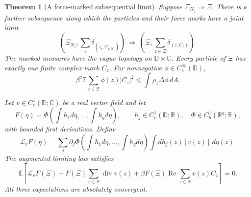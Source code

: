 \documentclass[11pt,a4paper]{article}
\numberwithin{equation}{section}
\newtheorem{theorem}{Theorem}[section]
\theoremstyle{definition}
\theoremstyle{remark}
\newcommand{\D}{\mathbb D}
\newcommand{\E}{\mathbb E}
\newcommand{\C}{\mathbb C}
\newcommand{\R}{\mathbb R}
\begin{document}
\begin{theorem}[A force-marked subsequential limit]
\label{thm:force-marked-limit}
Suppose $\Xi_{N_j}\Rightarrow\Xi$. There is a further subsequence along
which the particles and their force marks have a joint limit
\[
 \left(\Xi_{N_j},\sum_i\delta_{(z_i,C_{i,N_j})}\right)
 \ \Longrightarrow\
 \left(\Xi,\sum_{z\in\Xi}\delta_{(z,C_z)}\right).
\]
The marked measures have the vague topology on $\D\times\C$.
Every particle of $\Xi$ has exactly one finite complex mark $C_z$.
For nonnegative $\phi\in C_c^\infty(\D)$,
\begin{equation}\label{eq:limiting-force-energy}
 \beta^2\E\sum_{z\in\Xi}\phi(z)|C_z|^2
 \le\int\rho_1\Delta\phi\,dA.
\end{equation}

Let $v\in C_c^1(\D;\C)$ be a real vector field and let
\[
 F(\eta)=\Phi\left(\int h_1d\eta,\ldots,\int h_qd\eta\right),
 \qquad h_j\in C_c^1(\D;\R),\quad\Phi\in C_b^1(\R^q;\R),
\]
with bounded first derivatives. Define
\[
 \mathcal L_vF(\eta)
 =\sum_j\partial_j\Phi\left(\int h_1d\eta,\ldots,\int h_qd\eta\right)
                   \int dh_j(z)[v(z)]\,d\eta(z).
\]
The augmented limiting law satisfies
\begin{equation}\label{eq:augmented-limit-ward}
 \E\left[\mathcal L_vF(\Xi)
       +F(\Xi)\sum_{z\in\Xi}\operatorname{div}v(z)
       +\beta F(\Xi)\operatorname{Re}
                         \sum_{z\in\Xi}v(z)C_z\right]=0.
\end{equation}
All three expectations are absolutely convergent.
\end{theorem}
\end{document}
